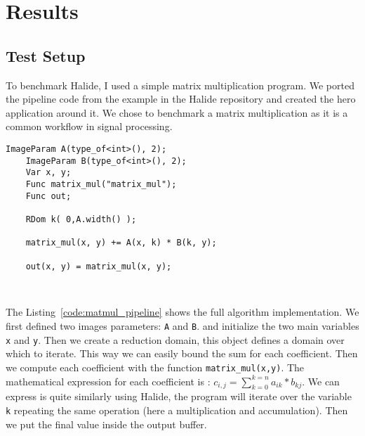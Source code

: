 
\chapter{Results}
\section{Test Setup}

    To benchmark Halide, I used a simple matrix multiplication program.
    We ported the pipeline code from the example in the Halide repository and created the \gls{hero} application around it.
    We chose to benchmark a matrix multiplication as it is a common workflow in signal processing.

\lstset{basicstyle=\ttfamily\footnotesize,breaklines=true,tabsize=2}
\begin{lstlisting}[caption={Matrix Multiplication Pipeline.}, captionpos=b, label={code:matmul_pipeline}]
    ImageParam A(type_of<int>(), 2);
    ImageParam B(type_of<int>(), 2);
    Var x, y;
    Func matrix_mul("matrix_mul");
    Func out;

    RDom k( 0,A.width() );

    matrix_mul(x, y) += A(x, k) * B(k, y);

    out(x, y) = matrix_mul(x, y);



\end{lstlisting}

    The Listing~\ref{code:matmul_pipeline} shows the full algorithm implementation. We first defined two images parameters: \texttt{A} and \texttt{B}. and initialize the two main variables \texttt{x} and \texttt{y}.
    Then we create a reduction domain, this object defines a domain over which to iterate.
    This way we can easily bound the sum for each coefficient. 
    Then we compute each coefficient with the function \texttt{matrix\_mul(x,y)}.
    The mathematical expression for each coefficient is : $c_{i,j} = \sum^{k=n}_{k=0} a_{ik}*b_{kj}$.
    We can express is quite similarly using Halide, the program will iterate over the variable \texttt{k} repeating the same operation (here a multiplication and accumulation).
    Then we put the final value inside the output buffer.
    
